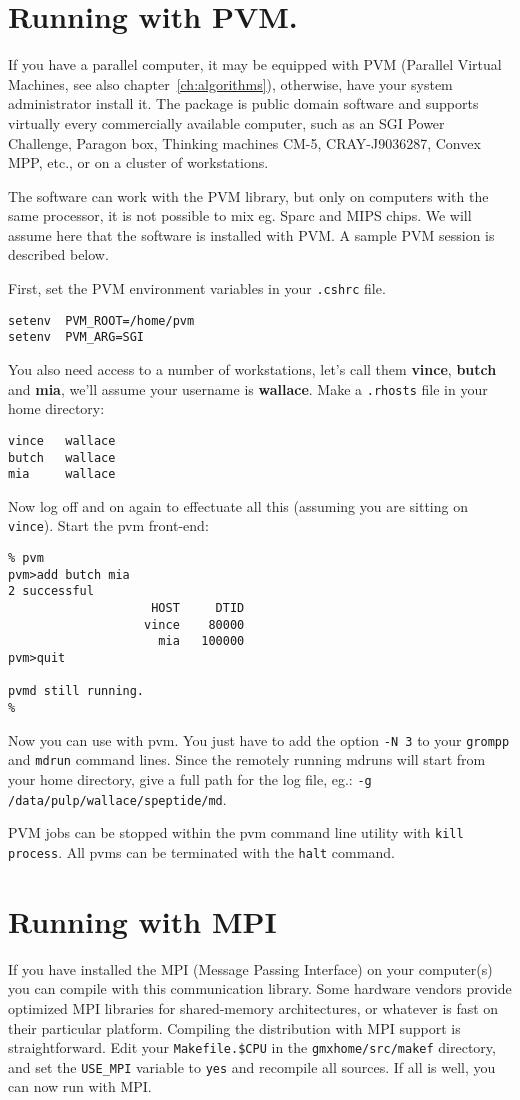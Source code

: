 \section{Running with PVM.}
If you have a parallel computer, it may be equipped
with PVM (Parallel Virtual Machines, see also chapter~\ref{ch:algorithms}),
otherwise, have your system administrator install it. The package
is public domain software and supports virtually every commercially
available computer, such as an SGI Power Challenge, Paragon {\intel} box,
Thinking machines CM-5, CRAY-J9036287, Convex MPP, etc., or on a cluster
of workstations.

The {\gromacs} software can work with the PVM library, but only
on computers with the same processor, it is not possible to mix
eg. Sparc and MIPS chips. We will assume
here that the software is installed with PVM. A sample PVM session
is described below.

First, set the PVM environment variables in your {\tt .cshrc} file.
\begin{verbatim}
setenv	PVM_ROOT=/home/pvm
setenv	PVM_ARG=SGI
\end{verbatim}
You also need access to a number of workstations, let's call them
{\bf vince}, {\bf butch} and {\bf mia}, we'll assume your username
is {\bf wallace}. Make a {\tt .rhosts} file in your home directory:
\begin{verbatim}
vince   wallace
butch   wallace
mia     wallace
\end{verbatim}
Now log off and on again to effectuate all this (assuming you are sitting on 
{\tt vince}). Start the pvm front-end: 
\begin{verbatim}
% pvm
pvm>add butch mia
2 successful
                    HOST     DTID
                   vince    80000
                     mia   100000
pvm>quit

pvmd still running.
%
\end{verbatim}
Now you can use {\gromacs} with pvm. You just have to add the option
{\tt -N 3} to your {\tt grompp} and {\tt mdrun} command lines. Since the
remotely running mdruns will start from your home directory, give a full 
path for the log file, eg.: {\tt -g /data/pulp/wallace/speptide/md}.

PVM jobs can be stopped within the pvm command line utility with
{\tt kill process}. All pvms can be terminated with the {\tt halt} command.

\section{Running with MPI}
If you have installed the MPI (Message Passing Interface) on your computer(s)
you can compile {\gromacs} with this communication library. Some
hardware vendors provide optimized MPI libraries for shared-memory
architectures, or whatever is fast on their particular platform.
Compiling the {\gromacs} distribution with MPI support is straightforward.
Edit your {\tt Makefile.\$CPU} in the {\tt gmxhome/src/makef} directory,
and set the {\tt USE\_MPI} variable to {\tt yes} and recompile all sources.
If all is well, you can now run with MPI. 

